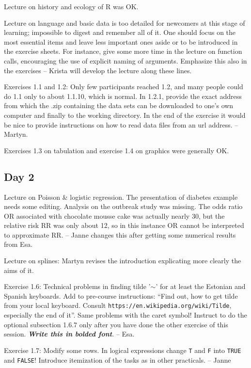 Lecture on history and ecology of R was OK. 

Lecture on language and basic data 
is too detailed for newcomers at this stage of learning; 
impossible to digest and remember all of it. 
One should focus on the most essential items and leave less important ones aside or to be introduced in the exercise sheets.
For instance, give some more time in the lecture on function calls, encouraging the use
of explicit naming of arguments. Emphasize this also in the exercises -- Krista
will develop the lecture along these lines.

Exercises 1.1 and 1.2: Only few participants reached 1.2, and many people could do 1.1 only to about 1.1.10, which is normal. 
In 1.2.1, provide the exact address from which the .zip containing the data sets can be downloaded to one's own computer and finally to the working directory.
In the end of the exercise it would be nice to provide instructions on how to read data files from an url address. -- Martyn.

Exercises 1.3 on tabulation and exercise 1.4 on graphics were generally OK. 

\subsection*{Day 2}

Lecture on Poisson \& logistic regression. 
The presentation of diabetes example needs some editing.
Analysis on the outbreak study was missing. 
The odds ratio OR associated with chocolate mousse cake was actually nearly 30, but the relative risk RR was only about 12, so in this instance OR cannot be interpreted to approximate RR.
-- Janne changes this after getting some numerical results from Esa.

Lecture on splines: Martyn revises the introduction explicating more clearly the aims of it.

Exercise 1.6: Technical problems in finding tilde '$\sim$' for at least the Estonian and Spanish keyboards. 
Add to pre-course instructions: ``Find out, how to get tilde from your local keyboard. 
Consult \verb|https://en.wikipedia.org/wiki/Tilde|, especially the end of it''.
Same problems with the caret symbol! 
Instruct to do the optional subsection 1.6.7 only after you have done the other 
exercise of this session. \textbf{\textit{Write this in bolded font}}.
-- Esa.

Exercise 1.7: Modify some rows.
In logical expressions change {\tt T} and {\tt F} into {\tt TRUE} and {\tt FALSE}!
Introduce itemization  of the tasks as in other practicals.
 -- Janne


